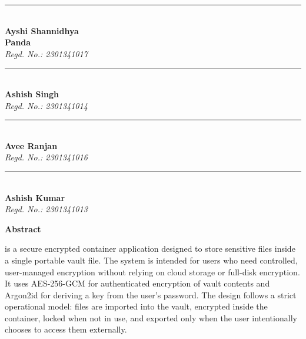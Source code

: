\vspace{1cm}
\noindent
\begin{minipage}[t]{.24\textwidth}
	\centering
	\vspace{1.5cm}
	\rule{3cm}{0.4pt}\\
	\textbf{Ayshi Shannidhya\\Panda}\\
	\textit{Regd. No.: 2301341017}
\end{minipage}
\begin{minipage}[t]{.24\textwidth}
	\centering
	\vspace{1.5cm}
	\rule{3cm}{0.4pt}\\
	\textbf{Ashish Singh}\\
	\textit{Regd. No.: 2301341014}
\end{minipage}
\begin{minipage}[t]{.24\textwidth}
	\centering
	\vspace{1.5cm}
	\rule{3cm}{0.4pt}\\
	\textbf{Avee Ranjan}\\
	\textit{Regd. No.: 2301341016}
\end{minipage}
\begin{minipage}[t]{.24\textwidth}
	\centering
	\vspace{1.5cm}
	\rule{3cm}{0.4pt}\\
	\textbf{Ashish Kumar}\\
	\textit{Regd. No.: 2301341013}
\end{minipage}
\clearpage
\thispagestyle{empty}
\sitheader

\vspace*{0.5cm}
\begin{center}
	\textbf{\Large Abstract}
\end{center}
{}

\flushleft 
\justify
\projname{} is a secure encrypted container application designed to store sensitive files inside a single portable vault file. The system is intended for users who need controlled, user-managed encryption without relying on cloud storage or full-disk encryption. It uses AES-256-GCM for authenticated encryption of vault contents and Argon2id for deriving a key from the user's password. The design follows a strict operational model: files are imported into the vault, encrypted inside the container, locked when not in use, and exported only when the user intentionally chooses to access them externally.

